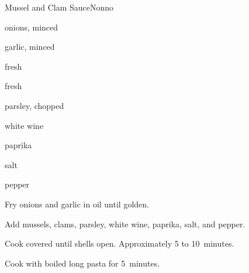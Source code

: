 \begin{recipe}{Mussel and Clam Sauce\FIXME}{Nonno}{}

\begin{ingredients}
\item onions, minced
\item garlic, minced
\item fresh 
\item fresh 
\item parsley, chopped
\item white wine
\item paprika
\item salt
\item pepper
\end{ingredients}

\begin{directions}
\item Fry onions and garlic in oil until golden.
\item Add mussels, clams, parsley, white wine, paprika, salt, and pepper.
\item Cook covered until shells open. Approximately 5 to 10~minutes.
\item Cook with boiled long pasta for 5~minutes.
\end{directions}

\end{recipe}
